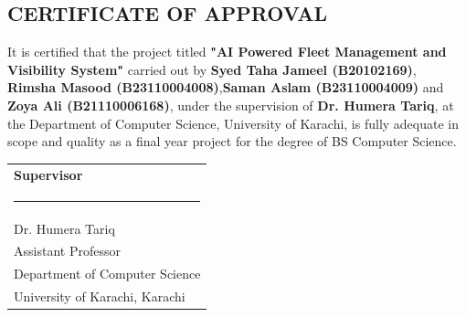 \providecommand\phantomsection{} \phantomsection
\thispagestyle{plain}
\renewcommand{\baselinestretch}{1}\small\normalsize
\begin{center}
\section*{\centering\MakeUppercase{Certificate of Approval}}
\end{center}
\justify
It is certified that the project titled \textbf{"AI Powered Fleet Management and Visibility System"} carried out by \textbf{Syed Taha Jameel (B20102169)}, \textbf{Rimsha Masood (B23110004008)},\textbf{Saman Aslam (B23110004009)} and \textbf{Zoya Ali (B21110006168)}, under the supervision of \textbf{Dr. Humera Tariq}, at the Department of Computer Science, University of Karachi, is fully adequate in scope and quality as a final year project for the degree of BS Computer Science.
\vspace{2cm}
\begin{table}[h]
\centering
{\renewcommand{\arraystretch}{1} %
\begin{tabular}{>{\centering}m{6.6cm}}
    \textbf{Supervisor}\vspace{1.5cm} \tabularnewline
    \rule{5cm}{0.4pt} \tabularnewline
    Dr. Humera Tariq \tabularnewline
    Assistant Professor \tabularnewline
    Department of Computer Science \tabularnewline
    University of Karachi, Karachi \tabularnewline
\end{tabular}
}
\end{table}
\newpage